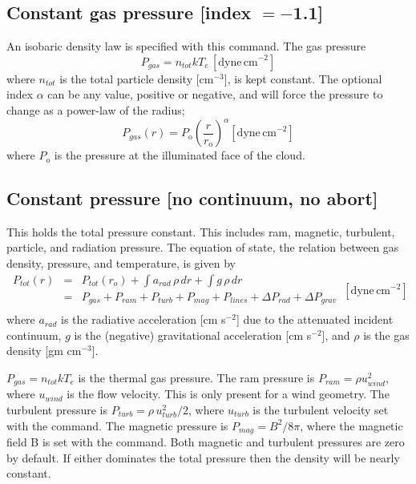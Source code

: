 \subsection{Constant gas pressure [index $=-$1.1]}

An isobaric density law is specified with this command.
The gas pressure
\begin{equation}
P_{gas} = n_{tot}kT_e \,  [\mathrm{dyne \,cm}^{-2}]
\end{equation}
where $n_{tot}$ is the total particle density [cm$^{-3}$],
is kept constant.
The optional index $\alpha$ can be any value, positive or negative,
and will force
the pressure to change as a power-law of the radius;
\begin{equation}
P_{gas}(r)=P_{\mathrm{o}}\left(\frac{r}{r_{\mathrm{o}}}\right)^{\alpha}
[\mathrm{dyne\, cm}^{-2}]
\end{equation}
where $P_{\mathrm{o}}$ is the pressure at the illuminated face of the cloud.

\subsection{Constant pressure [no continuum, no abort]}

This holds the total pressure constant.
This includes ram, magnetic,
turbulent, particle, and radiation pressure.
The equation of state,
the relation between gas density, pressure, and temperature,
is given by
\begin{equation}
\begin{array}{ccl}
 P_{tot} \left( r \right)& =& P_{tot} \left( {r_o } \right)
 + \int {a_{rad}\,\rho \,dr}  + \int {g\,\rho \,dr}  \\
&=& P_{gas} + P_{ram} + P_{turb} + P_{mag} + P_{lines} + \Delta P_{rad} + \Delta P_{grav} \\
 \end{array}\,
  [\mathrm{dyne\, cm}^{-2}]%
\end{equation}
where $a_{rad}$ is the radiative acceleration [cm s$^{-2}$] due to the attenuated
incident continuum, $g$ is the (negative) gravitational acceleration
[cm s$^{-2}$], and $\rho$ is the gas density [gm cm$^{-3}$].

$P_{gas}  = n_{tot} kT_e$ is the thermal gas pressure.
The ram pressure is $P_{ram} = \rho u_{wind}^2$, where $u_{wind}$ is the flow velocity.
This is only present for a wind geometry.
The turbulent pressure is $ P_{turb}  = \rho \,u_{turb}^2 /2$, where $u_{turb}$ is the turbulent velocity set with the  command.
The magnetic pressure is $P_{mag}  = B^2 /8\pi $, where the magnetic field B is set with the  command.
Both magnetic and turbulent pressures are zero by default.
If either dominates the total pressure then the density will be nearly constant.

